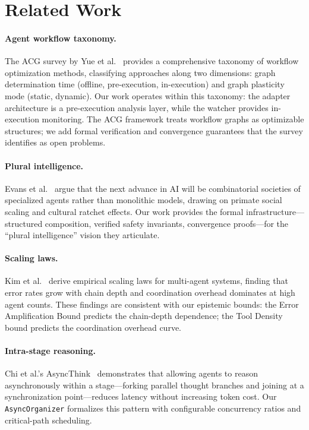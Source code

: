 \documentclass[11pt]{article}
\begin{document}
\section{Related Work}\label{sec:related}

\paragraph{Agent workflow taxonomy.}
The ACG survey by Yue et al.~\cite{yue2026acg} provides a comprehensive
taxonomy of workflow optimization methods, classifying approaches along
two dimensions: graph determination time (offline, pre-execution,
in-execution) and graph plasticity mode (static, dynamic).  Our work
operates within this taxonomy: the adapter architecture is a pre-execution
analysis layer, while the watcher provides in-execution monitoring.  The
ACG framework treats workflow graphs as optimizable structures; we add
formal verification and convergence guarantees that the survey identifies
as open problems.

\paragraph{Plural intelligence.}
Evans et al.~\cite{evans2026plural} argue that the next advance in AI
will be combinatorial societies of specialized agents rather than
monolithic models, drawing on primate social scaling and cultural ratchet
effects.  Our work provides the formal infrastructure---structured composition,
verified safety invariants, convergence proofs---for the ``plural
intelligence'' vision they articulate.

\paragraph{Scaling laws.}
Kim et al.~\cite{kim2025scaling} derive empirical scaling laws for
multi-agent systems, finding that error rates grow with chain depth and
coordination overhead dominates at high agent counts.  These findings
are consistent with our epistemic bounds: the Error Amplification
Bound predicts the chain-depth dependence; the Tool Density bound
predicts the coordination overhead curve.

\paragraph{Intra-stage reasoning.}
Chi et al.'s AsyncThink~\cite{chi2025asyncthink} demonstrates that
allowing agents to reason asynchronously within a stage---forking
parallel thought branches and joining at a synchronization point---reduces
latency without increasing token cost.  Our \texttt{AsyncOrganizer}
formalizes this pattern with configurable concurrency ratios and
critical-path scheduling.
\end{document}

